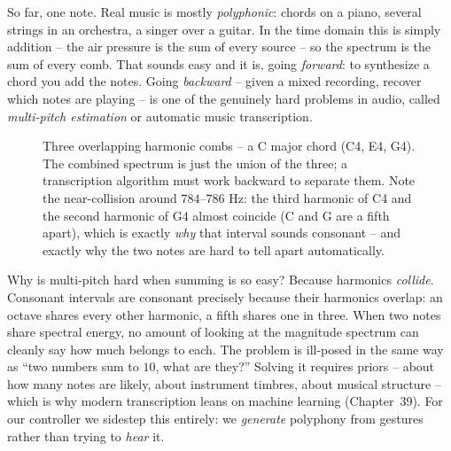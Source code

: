 So far, one note. Real music is mostly \emph{polyphonic}: chords on a piano, several strings in an
orchestra, a singer over a guitar. In the time domain this is simply addition -- the air pressure is
the sum of every source -- so the spectrum is the sum of every comb. That sounds easy and it is, going
\emph{forward}: to synthesize a chord you add the notes. Going \emph{backward} -- given a mixed
recording, recover which notes are playing -- is one of the genuinely hard problems in audio, called
\emph{multi-pitch estimation} or automatic music transcription.

\begin{figure}[H]
\centering
{}
\caption{Three overlapping harmonic combs -- a C major chord (C4, E4, G4). The combined spectrum is
just the union of the three; a transcription algorithm must work backward to separate them. Note the
near-collision around $784$--$786$ Hz: the third harmonic of C4 and the second harmonic of G4 almost
coincide (C and G are a fifth apart), which is exactly \emph{why} that interval sounds consonant -- and
exactly why the two notes are hard to tell apart automatically.}
\label{ch29:fig-chord}
\end{figure}

\begin{whybox}
Why is multi-pitch hard when summing is so easy? Because harmonics \emph{collide}. Consonant
intervals are consonant precisely because their harmonics overlap: an octave shares every other
harmonic, a fifth shares one in three. When two notes share spectral energy, no amount of looking at
the magnitude spectrum can cleanly say how much belongs to each. The problem is ill-posed in the same
way as ``two numbers sum to $10$, what are they?'' Solving it requires priors -- about how many notes
are likely, about instrument timbres, about musical structure -- which is why modern transcription
leans on machine learning (Chapter~39). For our controller we sidestep this entirely: we
\emph{generate} polyphony from gestures rather than trying to \emph{hear} it.
\end{whybox}

